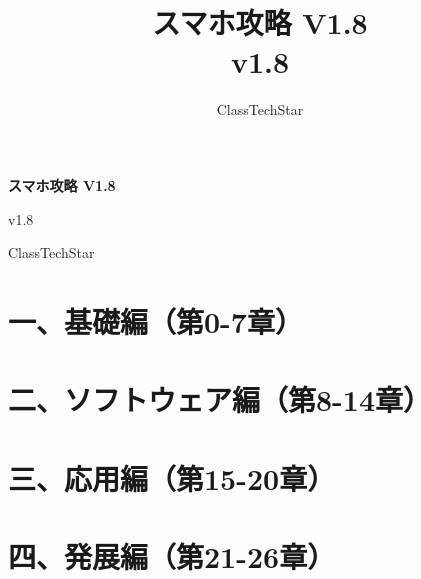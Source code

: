 \documentclass[11pt,a4paper,openany]{book}
\title{スマホ攻略 V1.8\\ \large v1.8}
\author{ClassTechStar}
\date{}
\begin{document}
\begin{titlepage}
\centering
\vspace*{0.28\textheight}
{\Huge\bfseries スマホ攻略 V1.8\par}
\vspace{1.2em}
{\Large v1.8\par}
\vfill
{\large ClassTechStar\par}
\end{titlepage}
\frontmatter
\tableofcontents
\mainmatter
\part*{一、基礎編（第0-7章）}










\part*{二、ソフトウェア編（第8-14章）}








\part*{三、応用編（第15-20章）}







\part*{四、発展編（第21-26章）}







\end{document}
